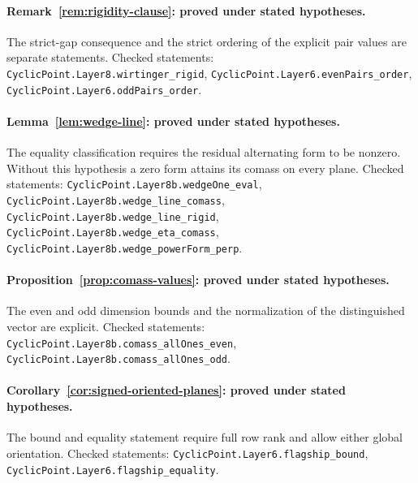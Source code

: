 \documentclass[11pt]{article}
\begin{document}
\paragraph{Remark~\ref{rem:rigidity-clause}: proved under stated hypotheses.}
The strict-gap consequence and the strict ordering of the explicit pair values are separate statements.
Checked statements: \texttt{CyclicPoint.\allowbreak Layer8.\allowbreak wirtinger\_\allowbreak rigid}, \texttt{CyclicPoint.\allowbreak Layer6.\allowbreak evenPairs\_\allowbreak order}, \texttt{CyclicPoint.\allowbreak Layer6.\allowbreak oddPairs\_\allowbreak order}.

\paragraph{Lemma~\ref{lem:wedge-line}: proved under stated hypotheses.}
The equality classification requires the residual alternating form to be nonzero. Without this hypothesis a zero form attains its comass on every plane.
Checked statements: \texttt{CyclicPoint.\allowbreak Layer8b.\allowbreak wedgeOne\_\allowbreak eval}, \texttt{CyclicPoint.\allowbreak Layer8b.\allowbreak wedge\_\allowbreak line\_\allowbreak comass}, \texttt{CyclicPoint.\allowbreak Layer8b.\allowbreak wedge\_\allowbreak line\_\allowbreak rigid}, \texttt{CyclicPoint.\allowbreak Layer8b.\allowbreak wedge\_\allowbreak eta\_\allowbreak comass}, \texttt{CyclicPoint.\allowbreak Layer8b.\allowbreak wedge\_\allowbreak powerForm\_\allowbreak perp}.

\paragraph{Proposition~\ref{prop:comass-values}: proved under stated hypotheses.}
The even and odd dimension bounds and the normalization of the distinguished vector are explicit.
Checked statements: \texttt{CyclicPoint.\allowbreak Layer8b.\allowbreak comass\_\allowbreak allOnes\_\allowbreak even}, \texttt{CyclicPoint.\allowbreak Layer8b.\allowbreak comass\_\allowbreak allOnes\_\allowbreak odd}.

\paragraph{Corollary~\ref{cor:signed-oriented-planes}: proved under stated hypotheses.}
The bound and equality statement require full row rank and allow either global orientation.
Checked statements: \texttt{CyclicPoint.\allowbreak Layer6.\allowbreak flagship\_\allowbreak bound}, \texttt{CyclicPoint.\allowbreak Layer6.\allowbreak flagship\_\allowbreak equality}.
\end{document}
